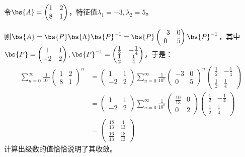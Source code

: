 \documentclass[12pt, a4paper, oneside, UTF8]{ctexbook}
\begin{document}
\begin{solution}
    令$\bs{A}=\begin{pmatrix}
         1 & 2\\
         8 &1
    \end{pmatrix}$，特征值$\lambda_1=-3,\lambda_2=5$。

    则$\bs{A}=\bs{P}\bs{\Lambda}\bs{P}^{-1}=\bs{P}\begin{pmatrix}
        -3 & 0\\
        0 & 5
    \end{pmatrix} \bs{P}^{-1}$，其中$\bs{P}=\begin{pmatrix}
        1 & 1\\
        -2& 2
    \end{pmatrix},\bs{P}^{-1}=\begin{pmatrix}
        \frac{1}{2} & -\frac{1}{4} \\
        \frac{1}{2} & \frac{1}{4}
    \end{pmatrix}$，于是：
    \begin{align*}
        \sum\limits_{n=0}^\infty \frac{1}{10^n}\begin{pmatrix}
            1 & 2 \\
            8& 1
        \end{pmatrix}^n
        &=\begin{pmatrix}
            1 & 1\\
            -2& 2
        \end{pmatrix}  \sum\limits_{n=0}^\infty \frac{1}{10^n}\begin{pmatrix}
            -3 & 0 \\
            0& 5
        \end{pmatrix}^n \begin{pmatrix}
            \frac{1}{2} & -\frac{1}{4} \\
            \frac{1}{2} & \frac{1}{4}
        \end{pmatrix}\\
    &=\begin{pmatrix}
        1 & 1\\
        -2& 2
    \end{pmatrix}  \sum\limits_{n=0}^\infty \frac{1}{10^n}\begin{pmatrix}
        \frac{10}{13} & 0 \\
        0& 2
    \end{pmatrix} \begin{pmatrix}
        \frac{1}{2} & -\frac{1}{4} \\
        \frac{1}{2} & \frac{1}{4}
    \end{pmatrix}\\
    &=\begin{pmatrix}
        \frac{18}{13}&\frac{4}{13}\\
        \frac{16}{13} & \frac{18}{13}
    \end{pmatrix}
    \end{align*}
计算出级数的值恰恰说明了其收敛。

\end{solution}
\end{document}
